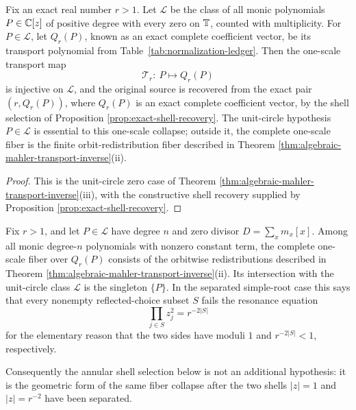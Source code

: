 \begin{theorem}\label{thm:leyang-single-scale-inverse}
Fix an exact real number \(r>1\).  Let \(\mathcal L\) be the class of all monic polynomials \(P\in\mathbb{C}[z]\) of positive degree with every zero on \(\mathbb{T}\), counted with multiplicity.  For \(P\in\mathcal L\), let \(Q_r(P)\), known as an exact complete coefficient vector, be its transport polynomial from Table~\ref{tab:normalization-ledger}.  Then the one-scale transport map
\[
\mathcal T_r:\ P\longmapsto Q_r(P)
\]
is injective on \(\mathcal L\), and the original source is recovered from the exact pair \((r,Q_r(P))\), where \(Q_r(P)\) is an exact complete coefficient vector, by the shell selection of Proposition \ref{prop:exact-shell-recovery}.  The unit-circle hypothesis \(P\in\mathcal L\) is essential to this one-scale collapse; outside it, the complete one-scale fiber is the finite orbit-redistribution fiber described in Theorem \ref{thm:algebraic-mahler-transport-inverse}\textup{(ii)}.
\end{theorem}

\begin{proof}
This is the unit-circle zero case of Theorem \ref{thm:algebraic-mahler-transport-inverse}(iii), with the constructive shell recovery supplied by Proposition \ref{prop:exact-shell-recovery}.
\end{proof}

\begin{corollary}\label{cor:no-resonance-leyang-fiber-collapse}
Fix \(r>1\), and let \(P\in\mathcal L\) have degree \(n\) and zero divisor \(D=\sum_xm_x[x]\).  Among all monic degree-\(n\) polynomials with nonzero constant term, the complete one-scale fiber over \(Q_r(P)\) consists of the orbitwise redistributions described in Theorem \ref{thm:algebraic-mahler-transport-inverse}\textup{(ii)}.  Its intersection with the unit-circle class \(\mathcal L\) is the singleton \(\{P\}\).  In the separated simple-root case this says that every nonempty reflected-choice subset \(S\) fails the resonance equation
\[
\prod_{j\in S}z_j^2=r^{-2|S|}
\]
for the elementary reason that the two sides have moduli \(1\) and \(r^{-2|S|}<1\), respectively.

Consequently the annular shell selection below is not an additional hypothesis: it is the geometric form of the same fiber collapse after the two shells \(|z|=1\) and \(|z|=r^{-2}\) have been separated.
\end{corollary}

